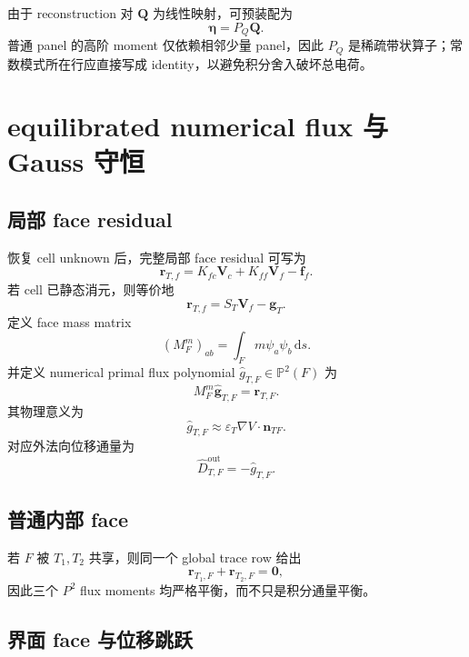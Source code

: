 \documentclass[UTF8,a4paper,11pt]{ctexart}
\newcommand{\Pp}{\mathbb{P}}
\newcommand{\dd}{\mathrm{d}}
\newcommand{\eps}{\varepsilon}
\newcommand{\vct}[1]{\bm{#1}}
\begin{document}
由于 reconstruction 对 \(\vct Q\) 为线性映射，可预装配为
\begin{equation}
\boxed{\vct\eta=P_Q\vct Q.}
\label{eq:PQ}
\end{equation}
普通 panel 的高阶 moment 仅依赖相邻少量 panel，因此 \(P_Q\) 是稀疏带状算子；常数模式所在行应直接写成 identity，以避免积分舍入破坏总电荷。

\section{equilibrated numerical flux 与 Gauss 守恒}

\subsection{局部 face residual}

恢复 cell unknown 后，完整局部 face residual 可写为
\begin{equation}
\vct r_{T,f}
=K_{fc}\vct V_c+K_{ff}\vct V_f-\vct f_f.
\label{eq:face_residual_full}
\end{equation}
若 cell 已静态消元，则等价地
\begin{equation}
\vct r_{T,f}=S_T\vct V_f-\vct g_T.
\label{eq:face_residual_condensed}
\end{equation}
定义 face mass matrix
\begin{equation}
(M_F^m)_{ab}=\int_Fm\psi_a\psi_b\,\dd s.
\label{eq:face_mass}
\end{equation}
并定义 numerical primal flux polynomial \(\widehat g_{T,F}\in\Pp^2(F)\) 为
\begin{equation}
\boxed{
M_F^m\widehat{\vct g}_{T,F}=\vct r_{T,F}.
}
\label{eq:primal_flux}
\end{equation}
其物理意义为
\[
\widehat g_{T,F}\approx \eps_T\nabla V\cdot\vct n_{TF}.
\]
对应外法向位移通量为
\[
\widehat D_{T,F}^{\mathrm{out}}=-\widehat g_{T,F}.
\]

\subsection{普通内部 face}

若 \(F\) 被 \(T_1,T_2\) 共享，则同一个 global trace row 给出
\begin{equation}
\boxed{
\vct r_{T_1,F}+\vct r_{T_2,F}=\vct0,
}
\label{eq:internal_flux_balance}
\end{equation}
因此三个 \(P^2\) flux moments 均严格平衡，而不只是积分通量平衡。

\subsection{界面 face 与位移跳跃}
\end{document}
